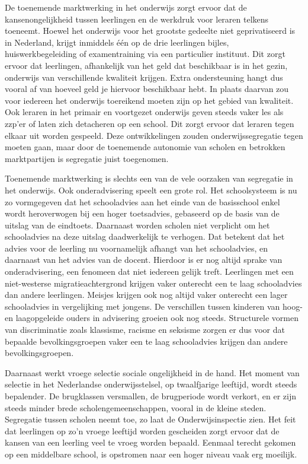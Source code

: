 De toenemende marktwerking in het onderwijs zorgt ervoor dat de
kansenongelijkheid tussen leerlingen en de werkdruk voor leraren telkens
toeneemt. Hoewel het onderwijs voor het grootste gedeelte niet
geprivatiseerd is in Nederland, krijgt inmiddels één op de drie
leerlingen bijles, huiswerkbegeleiding of examentraining via een
particulier instituut. Dit zorgt ervoor dat leerlingen, afhankelijk van
het geld dat beschikbaar is in het gezin, onderwijs van verschillende
kwaliteit krijgen. Extra ondersteuning hangt dus vooral af van hoeveel
geld je hiervoor beschikbaar hebt. In plaats daarvan zou voor iedereen
het onderwijs toereikend moeten zijn op het gebied van kwaliteit. Ook
leraren in het primair en voortgezet onderwijs geven steeds vaker les
als zzp'er of laten zich detacheren op een school. Dit zorgt ervoor dat
leraren tegen elkaar uit worden gespeeld. Deze ontwikkelingen zouden
onderwijssegregatie tegen moeten gaan, maar door de toenemende autonomie
van scholen en betrokken marktpartijen is segregatie juist toegenomen.

Toenemende marktwerking is slechts een van de vele oorzaken van
segregatie in het onderwijs. Ook onderadvisering speelt een grote rol.
Het schoolsysteem is nu zo vormgegeven dat het schooladvies aan het
einde van de basisschool enkel wordt heroverwogen bij een hoger
toetsadvies, gebaseerd op de basis van de uitslag van de eindtoets.
Daarnaast worden scholen niet verplicht om het schooladvies na deze
uitslag daadwerkelijk te verhogen. Dat betekent dat het advies voor de
leerling nu voornamelijk afhangt van het schooladvies, en daarnaast van
het advies van de docent. Hierdoor is er nog altijd sprake van
onderadvisering, een fenomeen dat niet iedereen gelijk treft. Leerlingen
met een niet-westerse migratieachtergrond krijgen vaker onterecht een te
laag schooladvies dan andere leerlingen. Meisjes krijgen ook nog altijd
vaker onterecht een lager schooladvies in vergelijking met jongens. De
verschillen tussen kinderen van hoog- en laagopgeleide ouders in
advisering groeien ook nog steeds. Structurele vormen van discriminatie
zoals klassisme, racisme en seksisme zorgen er dus voor dat bepaalde
bevolkingsgroepen vaker een te laag schooladvies krijgen dan andere
bevolkingsgroepen.

Daarnaast werkt vroege selectie sociale ongelijkheid in de hand. Het
moment van selectie in het Nederlandse onderwijsstelsel, op twaalfjarige
leeftijd, wordt steeds bepalender. De brugklassen versmallen, de
brugperiode wordt verkort, en er zijn steeds minder brede
scholengemeenschappen, vooral in de kleine steden. Segregatie tussen
scholen neemt toe, zo laat de Onderwijsinspectie zien. Het feit dat
leerlingen op zo'n vroege leeftijd worden gescheiden zorgt ervoor dat de
kansen van een leerling veel te vroeg worden bepaald. Eenmaal terecht
gekomen op een middelbare school, is opstromen naar een hoger niveau
vaak erg moeilijk.

